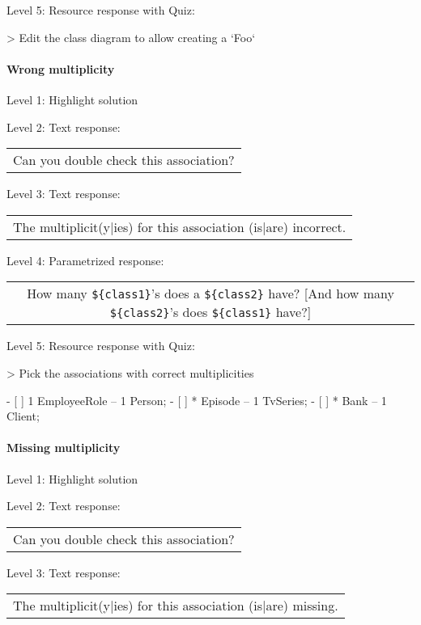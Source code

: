 \noindent Level 5: Resource response with Quiz:

> Edit the class diagram to allow creating a `Foo`


\paragraph{Wrong multiplicity}

\noindent Level 1: Highlight solution \medskip

\noindent Level 2: Text response: \medskip

\begin{tabular}{|c}
Can you double check this association?
\end{tabular} \medskip

\noindent Level 3: Text response: \medskip

\begin{tabular}{|c}
The multiplicit(y|ies) for this association (is|are) incorrect.
\end{tabular} \medskip

\noindent Level 4: Parametrized response: \medskip

\begin{tabular}{|c}
How many \verb|${class1}|'s does a \verb|${class2}| have? [And how many \verb|${class2}|'s does \verb|${class1}| have?]
\end{tabular} \medskip

\noindent Level 5: Resource response with Quiz:

> Pick the associations with correct multiplicities

- [ ] 1 EmployeeRole -- 1 Person;
- [ ] * Episode -- 1 TvSeries;
- [ ] * Bank -- 1 Client;


\paragraph{Missing multiplicity}

\noindent Level 1: Highlight solution \medskip

\noindent Level 2: Text response: \medskip

\begin{tabular}{|c}
Can you double check this association?
\end{tabular} \medskip

\noindent Level 3: Text response: \medskip

\begin{tabular}{|c}
The multiplicit(y|ies) for this association (is|are) missing.
\end{tabular} \medskip

